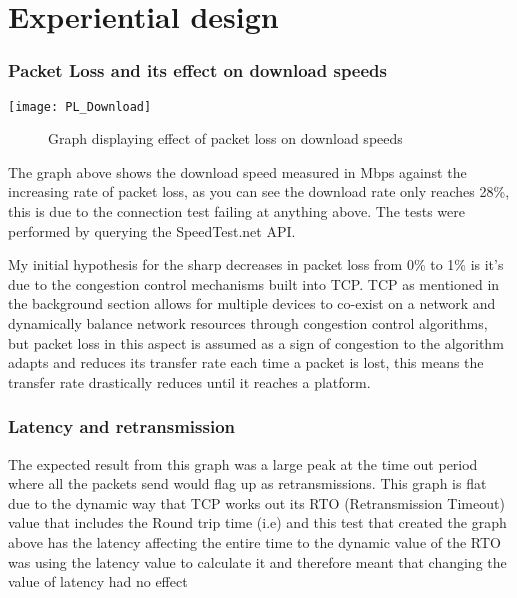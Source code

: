 \section{Experiential design}

\subsubsection{Packet Loss and its effect on download speeds}

\begin{center}
	\texttt{[image: PL\_Download]}
	\begin{figure}[h]
	 	\caption{Graph displaying effect of packet loss on download speeds}
	\end{figure}		
\end{center}

The graph above shows the download speed measured in Mbps against the increasing rate of packet loss, as you can see the download rate only reaches 28\%, this is due to the connection test failing at anything above. The tests were performed by querying the SpeedTest.net  API. 

My initial hypothesis for the sharp decreases in packet loss from 0\% to 1\% is it's due to the congestion control mechanisms built into TCP. TCP as mentioned in the background section allows for multiple devices to co-exist on a network and dynamically balance network resources through congestion control algorithms, but packet loss in this aspect is assumed as a sign of congestion to the algorithm adapts and reduces its transfer rate each time a packet is lost, this means the transfer rate drastically reduces until it reaches a platform.



\subsubsection{Latency and retransmission}

The expected result from this graph was a large peak at the time out period where all the packets send would flag up as retransmissions. This graph is flat due to the dynamic way that TCP works out its RTO (Retransmission Timeout) value that includes the Round trip time (i.e) and this test that created the graph above has the latency affecting the entire time to the dynamic value of the RTO was using the latency value to calculate it and therefore meant that changing the value of latency had no effect 

